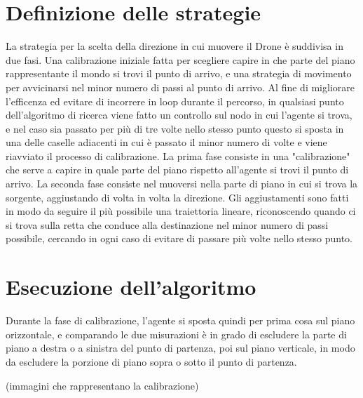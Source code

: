 \section{Definizione delle strategie}
La strategia per la scelta della direzione in cui muovere il Drone è suddivisa in due fasi. Una calibrazione iniziale fatta per scegliere capire in che parte del piano rappresentante il mondo si trovi il punto di arrivo, e una strategia di movimento per avvicinarsi nel minor numero di passi al punto di arrivo. Al fine di migliorare l'efficenza ed evitare di incorrere in loop durante il percorso, in qualsiasi punto dell'algoritmo di ricerca viene fatto un controllo sul nodo in cui l'agente si trova, e nel caso sia passato per più di tre volte nello stesso punto questo si sposta in una delle caselle adiacenti in cui è passato il minor numero di volte e viene riavviato il processo di calibrazione.
La prima fase consiste in una "calibrazione" che serve a capire in quale parte del piano rispetto all'agente si trovi il punto di arrivo. 
La seconda fase consiste nel muoversi nella parte di piano in cui si trova la sorgente, aggiustando di volta in volta la direzione. Gli aggiustamenti sono fatti in modo da seguire il più possibile una traiettoria lineare, riconoscendo quando ci si trova sulla retta che conduce alla destinazione nel minor numero di passi possibile, cercando in ogni caso di evitare di passare più volte nello stesso punto.
	
\section{Esecuzione dell'algoritmo}

Durante la fase di calibrazione, l'agente si sposta quindi per prima cosa sul piano orizzontale, e comparando le due misurazioni è in grado di escludere la parte di piano a destra o a sinistra del punto di partenza, poi sul piano verticale, in modo da escludere la porzione di piano sopra o sotto il punto di partenza. 

(immagini che rappresentano la calibrazione)

